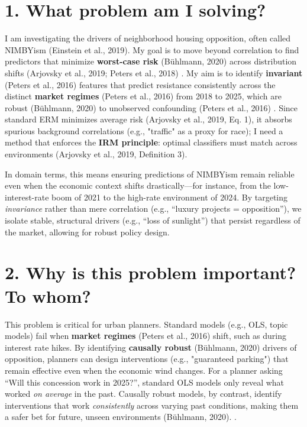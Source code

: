 \documentclass[11pt]{article}
\begin{document}
\section*{1. What problem am I solving?}
I am investigating the drivers of neighborhood housing opposition, often called NIMBYism (Einstein et al., 2019). My goal is to move beyond correlation to find predictors that minimize \textbf{worst-case risk} (Bühlmann, 2020) %
across distribution shifts (Arjovsky et al., 2019; Peters et al., 2018) %
. My aim is to identify \textbf{invariant} (Peters et al., 2016) %
features that predict resistance consistently across the distinct \textbf{market regimes} (Peters et al., 2016) %
from 2018 to 2025, which are robust (Bühlmann, 2020) %
to unobserved confounding (Peters et al., 2016) %
. Since standard ERM minimizes average risk (Arjovsky et al., 2019, Eq. 1), it absorbs spurious background correlations (e.g., "traffic" as a proxy for race); I need a method that enforces the \textbf{IRM principle}: optimal classifiers must match across environments (Arjovsky et al., 2019, Definition 3).

    In domain terms, this means ensuring predictions of NIMBYism remain reliable even when the economic context shifts drastically—for instance, from the low-interest-rate boom of 2021 to the high-rate environment of 2024. By targeting \textit{invariance} rather than mere correlation (e.g., ``luxury projects = opposition''), we isolate stable, structural drivers (e.g., ``loss of sunlight'') that persist regardless of the market, allowing for robust policy design.

\section*{2. Why is this problem important? To whom?}
This problem is critical for urban planners. Standard models (e.g., OLS, topic models) fail when \textbf{market regimes} (Peters et al., 2016) %
shift, such as during interest rate hikes. By identifying \textbf{causally robust} (Bühlmann, 2020) %
drivers of opposition, planners can design interventions (e.g., "guaranteed parking") that remain effective even when the economic wind changes.
    For a planner asking ``Will this concession work in 2025?'', standard OLS models only reveal what worked \textit{on average} in the past. Causally robust models, by contrast, identify interventions that work \textit{consistently} across varying past conditions, making them a safer bet for future, unseen environments (Bühlmann, 2020).
.
\end{document}
